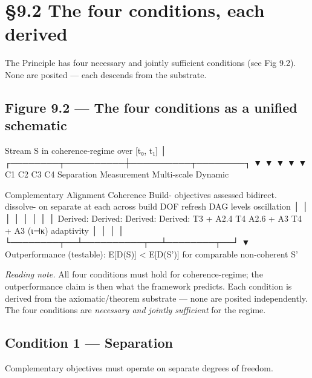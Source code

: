 \documentclass[11pt, openany]{book}
\renewenvironment{quote}{\begin{quoting}}{\end{quoting}}
\newcommand{\sectionbreak}{\clearpage}
\begin{document}
\sectionbreak

\section{§9.2 The four conditions, each derived}

The Principle has four necessary and jointly sufficient conditions (see Fig 9.2). None are posited --- each descends from the substrate.

\subsection{Figure 9.2 --- The four conditions as a unified schematic}

\begin{Code}
        Stream S in coherence-regime over [t₀, t₁]
                          │
      ┌────────┬──────────┼──────────┬────────┐
      ▼        ▼          ▼          ▼        ▼
    C1         C2         C3         C4
  Separation  Measurement Multi-scale Dynamic

  Complementary  Alignment   Coherence   Build-
  objectives     assessed    bidirect.   dissolve-
  on separate    at each     across      build
  DOF            refresh     DAG levels  oscillation
      │           │             │           │
      │           │             │           │
  Derived:    Derived:      Derived:    Derived:
  T3 + A2.4   T4            A2.6 + A3   T4 + A3
  (ι⊣κ)                                 adaptivity
      │           │             │           │
      └────────┬──┴──────────┬──┴────────┬──┘
                           ▼
               Outperformance (testable):
             E[D(S)] < E[D(S')] for comparable
                  non-coherent S'
\end{Code}

\textit{Reading note.} All four conditions must hold for coherence-regime; the outperformance claim is then what the framework predicts. Each condition is derived from the axiomatic/theorem substrate --- none are posited independently. The four conditions are \textit{necessary and jointly sufficient} for the regime.

\subsection{Condition 1 --- Separation}

\begin{quote}
Complementary objectives must operate on separate degrees of freedom.
\end{quote}
\end{document}
